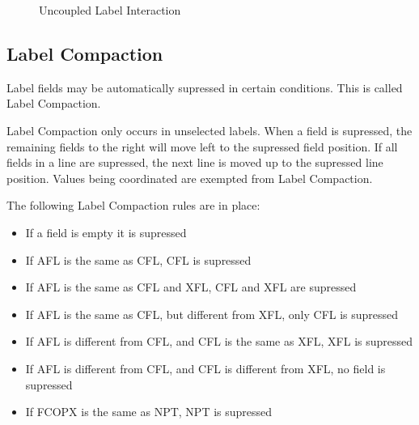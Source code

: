 \documentclass[a4paper,oneside,11pt]{memoir}
\newcommand{\winref}[1]{\textit{\titleref{#1}}}
\newcommand{\drawtag}[3]{\node[draw,red,minimum height=0.55cm,minimum width=#1] at (#2) (#3) {}}
\newcommand{\drawtagdesc}[4]{\node[draw,black,thick,text width=#1] at (#2) (#3) {#4};}
\begin{document}
\begin{figure}[H]
\centering
{}
\caption{Uncoupled Label Interaction}
\end{figure}


\subsection{Label Compaction}
\label{tlabel:comp}

Label fields may be automatically supressed in certain conditions. This is called Label Compaction.

Label Compaction only occurs in unselected labels. When a field is supressed, the remaining fields to the right will move left to the supressed field position. If all fields in a line are supressed, the next line is moved up to the supressed line position. Values being coordinated are exempted from Label Compaction.

\bigskip

The following Label Compaction rules are in place:

\begin{itemize}
  \item If a field is empty it is supressed
  \item If AFL is the same as CFL, CFL is supressed
  \item If AFL is the same as CFL and XFL, CFL and XFL are supressed
  \item If AFL is the same as CFL, but different from XFL, only CFL is supressed
  \item If AFL is different from CFL, and CFL is the same as XFL, XFL is supressed
  \item If AFL is different from CFL, and CFL is different from XFL, no field is supressed
  \item If FCOPX is the same as NPT, NPT is supressed
\end{itemize}
\end{document}
